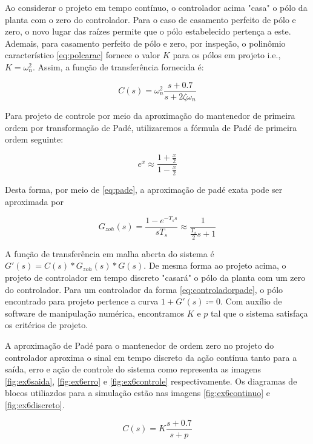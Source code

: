     Ao considerar o projeto em tempo contínuo, o controlador acima "casa" o pólo da planta com o zero do controlador. Para o caso de casamento perfeito de pólo e zero, o novo lugar das raízes permite que o pólo estabelecido pertença a este. Ademais, para casamento perfeito de pólo e zero, por inspeção, o polinômio característico \eqref{eq:polcarac} fornece o valor $K$ para os pólos em projeto i.e., $K = \omega_n^2$. Assim, a função de transferência fornecida é:
    
        \begin{equation}
            C(s) = \omega_n^2 \frac{s + 0.7}{s + 2 \zeta \omega_n}
        \end{equation}
        
    Para projeto de controle por meio da aproximação do mantenedor de primeira ordem por transformação de Padé, utilizaremos a fórmula de Padé de primeira ordem seguinte:
    
    \begin{equation}
    e^{x} \approx \frac{1 + \frac{x}{2}}{1 - \frac{x}{2}}
    \label{eq:pade}
    \end{equation}
    
    Desta forma, por meio de \eqref{eq:pade}, a aproximação de padé exata pode ser aproximada por
    
    \begin{equation}
    G_{zoh}(s) = \frac{1 - e^{-T_s s}}{s T_s} \approx \frac{1}{\frac{T_s}{2} s + 1}
    \end{equation}
    
    A função de transferência em malha aberta do sistema é $G'(s) = C(s)*G_{zoh}(s)*G(s)$. De mesma forma ao projeto acima, o projeto de controlador em tempo discreto "casará" o pólo da planta com um zero do controlador. Para um controlador da forma \eqref{eq:controladorpade}, o pólo encontrado para projeto pertence a curva $1 + G'(s) \coloneqq 0$.   Com auxílio de software de manipulação numérica, encontramos $K$ e $p$ tal que o sistema satisfaça os critérios de  projeto. 
    
    A aproximação de Padé para o mantenedor de ordem zero no projeto do controlador aproxima o sinal em tempo discreto da ação contínua tanto para a saída, erro e ação de controle do sistema como representa as imagens \ref{fig:ex6saida}, \ref{fig:ex6erro} e \ref{fig:ex6controle}  respectivamente. Os diagramas de blocos utiliazdos para a simulação estão nas imagens \ref{fig:ex6continuo} e \ref{fig:ex6discreto}.
    
    \begin{equation}
    \label{eq:controladorpade}
        C(s) = K \frac{s + 0.7}{s + p}
    \end{equation}
    
